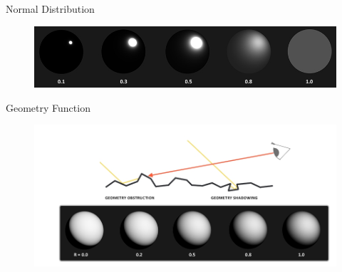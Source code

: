 \documentclass[]{beamer}
\begin{document}



\begin{frame}
  \textcolor{mypink1}{Normal Distribution} 
  \vspace{7mm}

  \begin{figure}[h!]
    \begin{center}
      \includegraphics[height=0.9in]{images/21.jpg}
    \end{center}
  \end{figure}
  
\end{frame}




\begin{frame}
  \textcolor{mypink1}{Geometry Function} 
  \vspace{7mm}

  \begin{figure}[h!]
    \begin{center}
      \includegraphics[height=2.in]{images/22.jpg}
    \end{center}
  \end{figure}
  
\end{frame}
\end{document}
